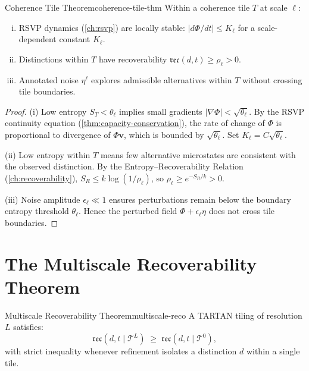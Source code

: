 \documentclass[12pt,twoside,openright]{book}
\newcommand{\reco}{\mathfrak{rec}}
\begin{document}
\begin{theorem}{Coherence Tile Theorem}{coherence-tile-thm}
  Within a coherence tile $T$ at scale $\ell$:
  \begin{enumerate}[(i)]
    \item RSVP dynamics (\cref{ch:rsvp}) are locally
          stable: $|d\Phi/dt| \le K_\ell$ for a
          scale-dependent constant $K_\ell$.
    \item Distinctions within $T$ have recoverability
          $\reco(d, t) \ge \rho_\ell > 0$.
    \item Annotated noise $\eta^\ell$ explores
          admissible alternatives within $T$ without
          crossing tile boundaries.
  \end{enumerate}
\end{theorem}

\begin{proof}
  (i) Low entropy $S_T < \theta_\ell$ implies small
  gradients $|\nabla\Phi| < \sqrt{\theta_\ell}$.
  By the RSVP continuity equation
  (\cref{thm:capacity-conservation}), the rate of
  change of $\Phi$ is proportional to divergence of
  $\Phi \mathbf{v}$, which is bounded by
  $\sqrt{\theta_\ell}$. Set
  $K_\ell = C\sqrt{\theta_\ell}$.

  (ii) Low entropy within $T$ means few alternative
  microstates are consistent with the observed
  distinction. By the Entropy--Recoverability Relation
  (\cref{ch:recoverability}), $S_R \le k\log(1/\rho_\ell)$,
  so $\rho_\ell \ge e^{-S_R/k} > 0$.

  (iii) Noise amplitude $\epsilon_\ell \ll 1$ ensures
  perturbations remain below the boundary entropy
  threshold $\theta_\ell$. Hence the perturbed field
  $\Phi + \epsilon_\ell \eta$ does not cross tile
  boundaries.
\end{proof}

\section{The Multiscale Recoverability Theorem}

\begin{theorem}{Multiscale Recoverability Theorem}{multiscale-reco}
  A TARTAN tiling of resolution $L$ satisfies:
  \[
    \reco(d, t \mid \mathcal{T}^L)
    \;\ge\;
    \reco(d, t \mid \mathcal{T}^0),
  \]
  with strict inequality whenever refinement isolates
  a distinction $d$ within a single tile.
\end{theorem}
\end{document}
